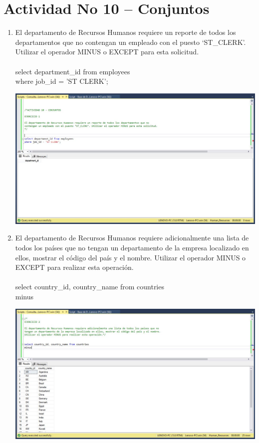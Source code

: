 \section{Actividad No 10 – Conjuntos} 

\begin{enumerate}[1.]
	\item El departamento de Recursos Humanos requiere un reporte de todos los departamentos que no contengan un empleado con el puesto ‘ST\_CLERK’. Utilizar el operador MINUS o EXCEPT para esta solicitud.
	\\
	\\select department\_id from employees
	\\where job\_id = 'ST CLERK';

	\begin{center}
	\includegraphics[width=17cm]{./Imagenes/Actividad10-Ejercicio01} 
	\end{center}

	\item El departamento de Recursos Humanos requiere adicionalmente una lista de todos los pa\'ises que no tengan un departamento de la empresa localizado en ellos, mostrar el código del país y el nombre. Utilizar el operador MINUS o EXCEPT para realizar esta operaci\'on.
	\\
	\\select country\_id, country\_name from countries
	\\minus

	\begin{center}
	\includegraphics[width=17cm]{./Imagenes/Actividad10-Ejercicio02} 
	\end{center}


\end{enumerate}
